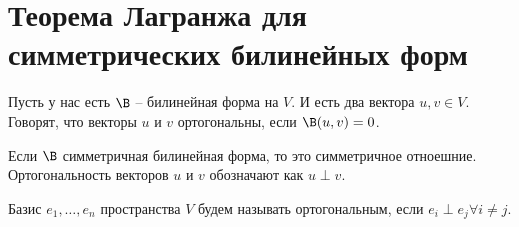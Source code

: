 \section{Теорема Лагранжа для симметрических билинейных форм}
\begin{conj}
    Пусть у нас есть $\B$ -- билинейная форма на $V$. И есть два вектора $u, v \in V$. Говорят, что векторы 
    $u$ и $v$ ортогональны, если $\B(u, v) = 0$.
\end{conj}

Если $\B$ симметричная билинейная форма, то это симметричное отноешние.
Ортогональность векторов $u$ и $v$ обозначают как $u \perp v$.

\begin{conj}
    Базис $e_1, \dots, e_n$ пространства $V$ будем называть ортогональным, если $e_i \perp e_j \forall i \neq j$. 
\end{conj}

